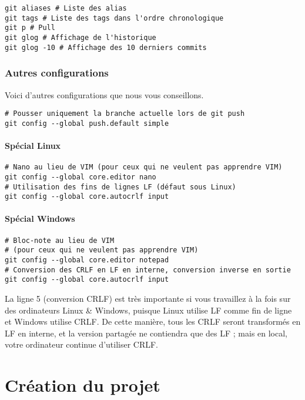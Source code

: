 \documentclass[10pt,a4paper]{article}
\begin{document}
\begin{verbatim}
git aliases # Liste des alias
git tags # Liste des tags dans l'ordre chronologique
git p # Pull
git glog # Affichage de l'historique
git glog -10 # Affichage des 10 derniers commits
\end{verbatim}

\subsubsection{Autres configurations}

Voici d'autres configurations que nous vous conseillons.

\begin{verbatim}
# Pousser uniquement la branche actuelle lors de git push
git config --global push.default simple
\end{verbatim}

\paragraph{Spécial Linux}

\begin{verbatim}
# Nano au lieu de VIM (pour ceux qui ne veulent pas apprendre VIM)
git config --global core.editor nano
# Utilisation des fins de lignes LF (défaut sous Linux)
git config --global core.autocrlf input
\end{verbatim}

\paragraph{Spécial Windows}

\begin{verbatim}
# Bloc-note au lieu de VIM
# (pour ceux qui ne veulent pas apprendre VIM)
git config --global core.editor notepad
# Conversion des CRLF en LF en interne, conversion inverse en sortie
git config --global core.autocrlf input
\end{verbatim}

La ligne 5 (conversion CRLF) est très importante si vous travaillez à la fois sur des ordinateurs Linux \& Windows, puisque Linux utilise LF comme fin de ligne et Windows utilise CRLF. De cette manière, tous les CRLF seront transformés en LF en interne, et la version partagée ne contiendra que des LF ; mais en local, votre ordinateur continue d'utiliser CRLF.

\section{Création du projet}
\end{document}

